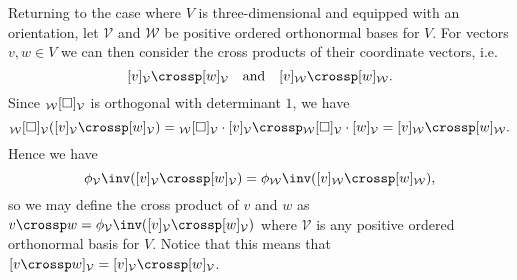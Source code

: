 \documentclass[article, a4paper, 11pt, oneside]{memoir}
\numberwithin{equation}{chapter}
\newcommand{\calV}{\mathcal{V}}
\newcommand{\calW}{\mathcal{W}}
\begin{document}
Returning to the case where $V$ is three-dimensional and equipped with an orientation, let $\calV$ and $\calW$ be positive ordered orthonormal bases for $V$. For vectors $v,w \in V$ we can then consider the cross products of their coordinate vectors, i.e.
%
\begin{equation*}
    \coordvec{v}{\calV} \crossp \coordvec{w}{\calV}
    \quad \text{and} \quad
    \coordvec{v}{\calW} \crossp \coordvec{w}{\calW}.
\end{equation*}
%
Since $\basischangemat{\calW}{\calV}$ is orthogonal with determinant $1$, we have
%
\begin{equation*}
    \basischangemat{\calW}{\calV}(\coordvec{v}{\calV} \crossp \coordvec{w}{\calV})
        = \basischangemat{\calW}{\calV} \cdot \coordvec{v}{\calV} \crossp \basischangemat{\calW}{\calV} \cdot \coordvec{w}{\calV}
        = \coordvec{v}{\calW} \crossp \coordvec{w}{\calW}.
\end{equation*}
%
Hence we have
%
\begin{equation*}
    \coordmap{\calV}\inv(\coordvec{v}{\calV} \crossp \coordvec{w}{\calV})
        = \coordmap{\calW}\inv(\coordvec{v}{\calW} \crossp \coordvec{w}{\calW}),
\end{equation*}
%
so we may define the cross product of $v$ and $w$ as $v \crossp w = \coordmap{\calV}\inv(\coordvec{v}{\calV} \crossp \coordvec{w}{\calV})$ where $\calV$ is any positive ordered orthonormal basis for $V$. Notice that this means that $\coordvec{v \crossp w}{\calV} = \coordvec{v}{\calV} \crossp \coordvec{w}{\calV}$.
\end{document}
